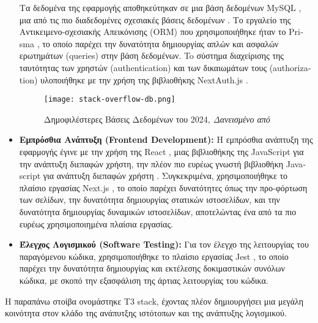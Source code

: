\begin{itemize}
    Τα δεδομένα της εφαρμογής αποθηκεύτηκαν σε μια βάση δεδομένων
    \textlatin{MySQL} \cite{mysql}, μια από τις πιο διαδεδομένες σχεσιακές
    βάσεις δεδομένων \cite{so2024}. Tο εργαλείο της Αντικειμενο-σχεσιακής
    Απεικόνισης \textlatin{(ORM)} που χρησιμοποιήθηκε ήταν το
    \textlatin{Prisma} \cite{prisma}, το οποίο παρέχει την δυνατότητα
    δημιουργίας απλών και ασφαλών ερωτημάτων \textlatin{(queries)} στην
    βάση δεδομένων. To σύστημα διαχείρισης της ταυτότητας των χρηστών
    \textlatin{(authentication)} και των δικαιωμάτων τους
    \textlatin{(authorization)} υλοποιήθηκε με την χρήση της βιβλιοθήκης
    \textlatin{NextAuth.js} \cite{nextauth}.
    \begin{figure}[H]
      \begin{center}
        \texttt{[image: stack-overflow-db.png]}
        \caption{Δημοφιλέστερες Βάσεις Δεδομένων του 2024,
        \textit{Δανεισμένο από \cite{so2024}}}
      \end{center}
      \label{fig:SO2024DB}
    \end{figure}
  \item
    \textbf{Εμπρόσθια Ανάπτυξη (\textlatin{Frontend Development}):} Η
    εμπρόσθια ανάπτυξη της εφαρμογής έγινε με την χρήση της
    \textlatin{React} \cite{react}, μιας βιβλιοθήκης της
    \textlatin{JavaScript} για την ανάπτυξη διεπαφών χρήστη, την πλέον πιο
    ευρέως γνωστή βιβλιοθήκη \textlatin{Javascript} για ανάπτυξη διεπαφών
    χρήστη \cite{so2024}. Συγκεκριμένα, χρησιμοποιήθηκε το πλαίσιο
    εργασίας \textlatin{Next.js} \cite{nextjs}, το οποίο παρέχει
    δυνατότητες όπως την προ-φόρτωση των σελίδων, την δυνατότητα
    δημιουργίας στατικών ιστοσελίδων, και την δυνατότητα δημιουργίας
    δυναμικών ιστοσελίδων, αποτελώντας ένα από τα πιο ευρέως
    χρησιμοποιημένα πλαίσια εργασίας.
  \item
    \textbf{Έλεγχος Λογισμικού (\textlatin{Software Testing}):} Για τον
    έλεγχο της λειτουργίας του παραγόμενου κώδικα, χρησιμοποιήθηκε το
    πλαίσιο εργασίας \textlatin{Jest} \cite{jest}, το οποίο παρέχει την
    δυνατότητα δημιουργίας και εκτέλεσης δοκιμαστικών συνόλων κώδικα, με
    σκοπό την εξασφάλιση της άρτιας λειτουργίας του κώδικα.
    \cite{Jacobson1999,irena2008,swebok2004,miller1981,shaw1990}
\end{itemize}

Η παραπάνω στοίβα ονομάστηκε \textlatin{T3 stack}, έχοντας πλέον
δημιουργήσει μια μεγάλη κοινότητα στον κλάδο της ανάπυτξης ιστότοπων και
της ανάπτυξης λογισμικού. \cite{t3repo}

